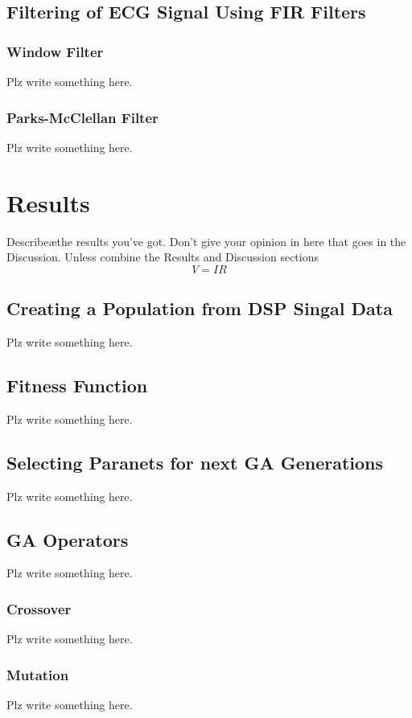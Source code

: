 \documentclass[a4paper, 11pt]{article}
\begin{document}
    \subsection{Filtering of ECG Signal Using FIR Filters}\label{sec:meth_sub5}
        \subsubsection{Window Filter}
            Plz write something here.
        \subsubsection{Parks-McClellan Filter}
            Plz write something here.

\section{Results}\label{sec:res}
    Describe\ae the results you've got. Don't give your opinion in here that goes in the Discussion.
    Unless combine the Results and Discussion sections \begin{equation} V = IR\end{equation}

    \subsection{Creating a Population from DSP Singal Data}\label{sec:meth_sub1}
    Plz write something here.
    \subsection{Fitness Function}\label{sec:meth_sub2}
    Plz write something here.
    \subsection{Selecting Paranets for next GA Generations}\label{sec:meth_sub3}
    Plz write something here.
    \subsection{GA Operators}\label{sec:meth_sub4}
    Plz write something here.
        \subsubsection{Crossover}
            Plz write something here.
        \subsubsection{Mutation}
            Plz write something here.
\end{document}
